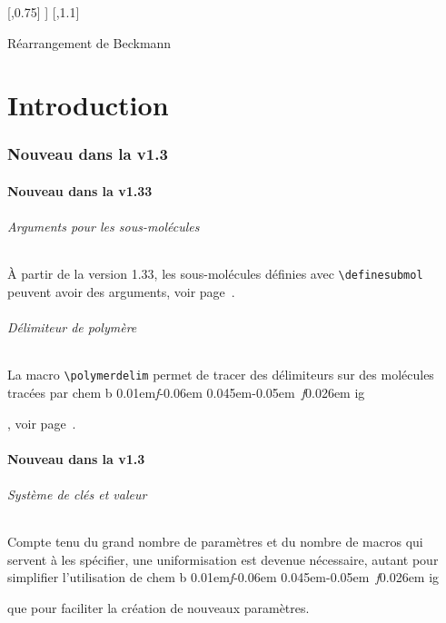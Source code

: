 \documentclass[10pt,french]{article}
\makeatletter
\DeclareRobustCommand\CF{%
	\textsf{%
		chem%
		\if\string b\detokenize\expandafter{\f@series}%
			\lower0.01em\hbox{\itshape f}\kern-0.06em
		\else
			\lower0.045em\hbox{\kern-0.05em \itshape f}\kern0.026em
		\fi ig%
		}%
		\xspace
}
\makeatother
\begin{document}
\begin{titlepage}
{{{		    
		    \arrow{<->}[,0.75]
		    }}\chemright]
		  \arrow
		\schemestop\hss}\hfill\null
	\begin{center}
		\sffamily\small Réarrangement de Beckmann%
	\end{center}
\end{titlepage}
\parindent0pt\pagestyle{plain}
\tableofcontents
\parskip\medskipamount
\newpage

\part{Introduction}
\section{Nouveau dans la v1.3}
\subsection{Nouveau dans la v1.33}
\paragraph{Arguments pour les sous-molécules}
À partir de la version 1.33, les sous-molécules définies avec \verb|\definesubmol| peuvent avoir des arguments, voir page~\pageref{definesubmolarg}.

\paragraph{Délimiteur de polymère}
La macro \verb|\polymerdelim| permet de tracer des délimiteurs sur des molécules tracées par \CF, voir page~\pageref{polymerdelim}.

\subsection{Nouveau dans la v1.3}
\paragraph{Système de clés et valeur}Compte tenu du grand nombre de paramètres et du nombre de macros qui servent à les spécifier, une uniformisation est devenue nécessaire, autant pour simplifier l'utilisation de \CF que pour faciliter la création de nouveaux paramètres.
\end{document}
